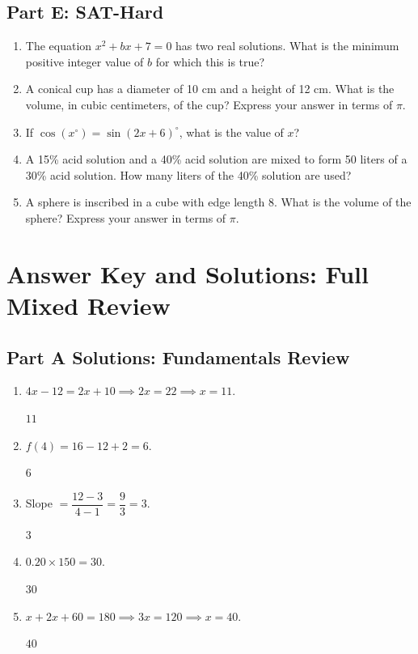\documentclass[14pt]{extarticle}
\begin{document}
\subsection*{Part E: SAT-Hard}
\begin{enumerate}
  \item The equation \(x^2 + bx + 7 = 0\) has two real solutions. What is the minimum positive integer value of \(b\) for which this is true?
  \item A conical cup has a diameter of 10 cm and a height of 12 cm. What is the volume, in cubic centimeters, of the cup? Express your answer in terms of \(\pi\).
  \item If \(\cos(x^\circ) = \sin(2x + 6)^\circ\), what is the value of \(x\)?
  \item A 15\% acid solution and a 40\% acid solution are mixed to form 50 liters of a 30\% acid solution. How many liters of the 40\% solution are used?
  \item A sphere is inscribed in a cube with edge length 8. What is the volume of the sphere? Express your answer in terms of \(\pi\).
\end{enumerate}

\newpage

\section*{Answer Key and Solutions: Full Mixed Review}

\subsection*{Part A Solutions: Fundamentals Review}
\begin{enumerate}
  \item \(4x - 12 = 2x + 10 \implies 2x = 22 \implies x = 11\).

  \(\boxed{11}\)

  \item \(f(4) = 16 - 12 + 2 = 6\).

  \(\boxed{6}\)

  \item Slope \(= \dfrac{12 - 3}{4 - 1} = \dfrac{9}{3} = 3\).

  \(\boxed{3}\)

  \item \(0.20 \times 150 = 30\).

  \(\boxed{30}\)

  \item \(x + 2x + 60 = 180 \implies 3x = 120 \implies x = 40\).

  \(\boxed{40}\)
\end{enumerate}
\end{document}
